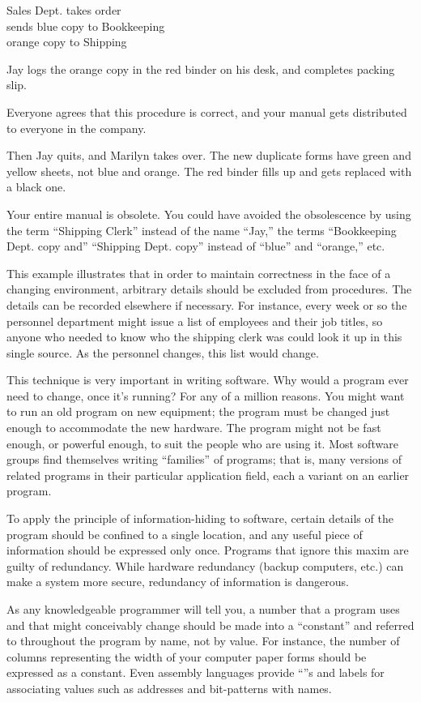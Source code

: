 \begin{tfquot}
Sales Dept. takes order\\
sends blue copy to Bookkeeping\\
orange copy to Shipping

Jay logs the orange copy in the red binder on his desk, and completes
packing slip.
\end{tfquot}
Everyone agrees that this procedure is correct, and your manual gets
distributed to everyone in the company.

Then Jay quits, and Marilyn takes over. The new duplicate forms have
green and yellow sheets, not blue and orange. The red binder fills up
and gets replaced with a black one.

Your entire manual is obsolete. You could have avoided the
obsolescence by using the term ``Shipping Clerk'' instead of the name
``Jay,'' the terms ``Bookkeeping Dept. copy and'' ``Shipping Dept.  copy''
instead of ``blue'' and ``orange,'' etc.

This example illustrates that in order to maintain correctness in the
face of a changing environment, arbitrary details should be excluded
from procedures. The details can be recorded elsewhere if necessary.
For instance, every week or so the personnel department might issue a
list of employees and their job titles, so anyone who needed to know
who the shipping clerk was could look it up in this single source.  As
the personnel changes, this list would change.

This technique is very important in writing software. Why would a
program ever need to change, once it's running? For any of a million
reasons. You might want to run an old program on new equipment; the
program must be changed just enough to accommodate the new hardware.
The program might not be fast enough, or powerful enough, to suit the
people who are using it. Most software groups find themselves writing
``families'' of programs; that is, many versions of related programs
in their particular application field, each a variant on an earlier
program. 

To apply the principle of information-hiding to software, certain
details of the program should be confined to a single location, and
any useful piece of information should be expressed only once.
Programs that ignore this maxim are guilty of redundancy. While
hardware redundancy (backup computers, etc.) can make a system more
secure, redundancy of information is dangerous.

As any knowledgeable programmer will tell you, a number that a program
uses and that might conceivably change should be made into a ``constant''
and referred to throughout the program by name, not by value. For
instance, the number of columns representing the width of your computer
paper forms should be expressed as a constant. Even assembly languages
provide ``''s and labels for associating values such as
addresses and bit-patterns with names.

